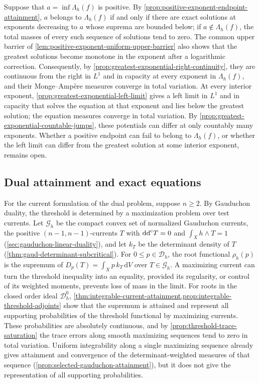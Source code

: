 Suppose that $a=\inf\Lambda_h(f)$ is positive. By \cref{prop:positive-exponent-endpoint-attainment}, $a$ belongs to $\Lambda_h(f)$ if and only if there are exact solutions at exponents decreasing to $a$ whose suprema are bounded below; if $a\notin\Lambda_h(f)$, the total masses of every such sequence of solutions tend to zero. The common upper barrier of \cref{lem:positive-exponent-uniform-upper-barrier} also shows that the greatest solutions become monotone in the exponent after a logarithmic correction. Consequently, by \cref{prop:greatest-exponential-right-continuity}, they are continuous from the right in $L^1$ and in capacity at every exponent in $\Lambda_h(f)$, and their Monge--Amp\`ere measures converge in total variation. At every interior exponent, \cref{prop:greatest-exponential-left-limit} gives a left limit in $L^1$ and in capacity that solves the equation at that exponent and lies below the greatest solution; the equation measures converge in total variation. By \cref{prop:greatest-exponential-countable-jumps}, these potentials can differ at only countably many exponents. Whether a positive endpoint can fail to belong to $\Lambda_h(f)$, or whether the left limit can differ from the greatest solution at some interior exponent, remains open.

\subsection{Dual attainment and exact equations}

For the current formulation of the dual problem, suppose $n\geq2$. By Gauduchon duality, the threshold is determined by a maximization problem over test currents. Let $\mathscr G_h$ be the compact convex set of normalized Gauduchon currents, the positive $(n-1,n-1)$-currents $T$ with $\mathrm{dd}^{\mathrm{c}} T=0$ and $\int_Xh\wedge T=1$ (\cref{sec:gauduchon-linear-duality}), and let $k_T$ be the determinant density of $T$ (\cref{thm:gaud-determinant-subcritical}). For $0\leq p\in\mathcal D_h$, the root functional $\rho_h(p)$ is the supremum of $D_p(T)=\int_Xp\,k_T\,\mathrm{d}V$ over $T\in\mathscr G_h$. A maximizing current can turn the threshold inequality into an equality, provided its regularity, or control of its weighted moments, prevents loss of mass in the limit. For roots in the closed order ideal $\mathcal D_h^0$, \cref{thm:integrable-current-attainment,prop:integrable-threshold-adjoints} show that the supremum is attained and represent all supporting probabilities of the threshold functional by maximizing currents. These probabilities are absolutely continuous, and by \cref{prop:threshold-trace-saturation} the trace errors along smooth maximizing sequences tend to zero in total variation. Uniform integrability along a single maximizing sequence already gives attainment and convergence of the determinant-weighted measures of that sequence (\cref{prop:selected-gauduchon-attainment}), but it does not give the representation of all supporting probabilities.

